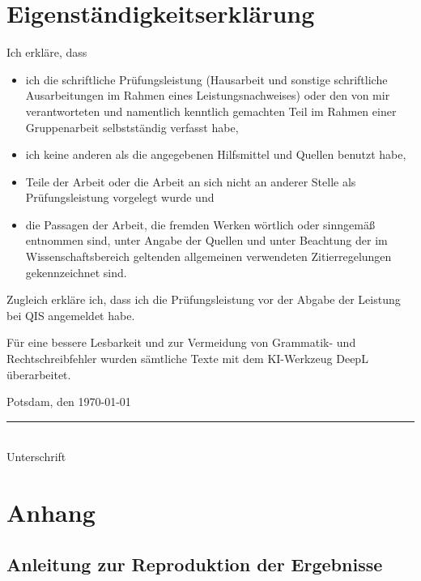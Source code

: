 \documentclass[
    a4paper,
    12pt,
    headinclude=true,
    BCOR=10mm,
]{scrreprt}
\begin{document}
\chapter*{Eigenständigkeitserklärung}
Ich erkläre, dass
\begin{itemize}
    \item ich die schriftliche Prüfungsleistung (Hausarbeit und sonstige schriftliche Ausarbeitungen im Rahmen eines Leistungsnachweises) oder den von mir verantworteten und namentlich kenntlich gemachten Teil im Rahmen einer Gruppenarbeit selbstständig verfasst habe,
    \item ich keine anderen als die angegebenen Hilfsmittel und Quellen benutzt habe,
    \item Teile der Arbeit oder die Arbeit an sich nicht an anderer Stelle als Prüfungsleistung vorgelegt wurde und
    \item die Passagen der Arbeit, die fremden Werken wörtlich oder sinngemäß entnommen sind, unter Angabe der Quellen und unter Beachtung der im Wissenschaftsbereich geltenden allgemeinen verwendeten Zitierregelungen gekennzeichnet sind.
\end{itemize}

Zugleich erkläre ich, dass ich die Prüfungsleistung vor der Abgabe der Leistung bei QIS angemeldet habe.

Für eine bessere Lesbarkeit und zur Vermeidung von Grammatik- und Rechtschreibfehler wurden sämtliche Texte mit dem KI-Werkzeug DeepL überarbeitet.

\vspace{2cm}

\noindent
Potsdam, den \today

\vspace{2cm}

\noindent
\rule{6cm}{0.4pt}\\
Unterschrift
\newpage

\chapter*{Anhang}

\section*{Anleitung zur Reproduktion der Ergebnisse}
\end{document}

